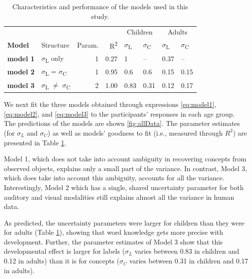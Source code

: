 \documentclass[english,,man]{apa6}
\theoremstyle{definition}
\theoremstyle{definition}
\theoremstyle{definition}
\theoremstyle{remark}
\begin{document}
\begin{table}

\caption{\label{tab:models}Characteristics and performance of the models used in this study.}
\centering
\begin{tabular}[t]{>{\bfseries}llrrllll}
\toprule
\multicolumn{1}{c}{} & \multicolumn{1}{c}{} & \multicolumn{1}{c}{} & \multicolumn{1}{c}{} & \multicolumn{2}{c}{Children} & \multicolumn{2}{c}{Adults} \\
\cmidrule(l{2pt}r{2pt}){5-6} \cmidrule(l{2pt}r{2pt}){7-8}
Model & Structure & Param. & R\textsuperscript{2} & $\sigma$\textsubscript{L} & $\sigma$\textsubscript{C} & $\sigma$\textsubscript{L} & $\sigma$\textsubscript{C}\\
\midrule
model 1 & $\sigma$\textsubscript{L} only & 1 & 0.27 & 1 & -- & 0.37 & --\\
model 2 & $\sigma$\textsubscript{L} = $\sigma$\textsubscript{C} & 1 & 0.95 & 0.6 & 0.6 & 0.15 & 0.15\\
model 3 & $\sigma$\textsubscript{L} $\neq$ $\sigma$\textsubscript{C} & 2 & 1.00 & 0.83 & 0.31 & 0.12 & 0.17\\
\bottomrule
\end{tabular}
\end{table}

We next fit the three models obtained through expressions
\ref{eq:model1}, \ref{eq:model2}, and \ref{eq:model3} to the
participants' responses in each age group. The predictions of the models
are shown \ref{fig:allData}. The parameter estimates (for \(\sigma_L\)
and \(\sigma_C\)) as well as models' goodness to fit (i.e., measured
through \(R^2\)) are presented in Table \ref{tab:models}.

Model 1, which does not take into account ambiguity in recovering
concepts from observed objects, explains only a small part of the
variance. In contrast, Model 3, which does take into account this
ambiguity, accounts for all the variance. Interestingly, Model 2 which
has a single, shared uncertainty parameter for both auditory and visual
modalities still explains almost all the variance in human data.

As predicted, the uncertainty parameters were larger for children than
they were for adults (Table \ref{tab:models}), showing that word
knowledge gets more precise with development. Further, the parameter
estimates of Model 3 show that this developmental effect is larger for
labels (\(\sigma_L\) varies between 0.83 in children and 0.12 in adults)
than it is for concepts (\(\sigma_C\) varies between 0.31 in children
and 0.17 in adults).
\end{document}
